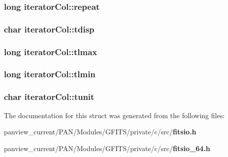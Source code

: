 \subsubsection{\setlength{\rightskip}{0pt plus 5cm}long \bf{iterator\-Col::repeat}}\label{structiteratorCol_4316f8b44d3df0ca6c847ee578ef2f2a}


\subsubsection{\setlength{\rightskip}{0pt plus 5cm}char \bf{iterator\-Col::tdisp}}\label{structiteratorCol_b7ded5b2f1a55f33faae8aad25f0e661}


\subsubsection{\setlength{\rightskip}{0pt plus 5cm}long \bf{iterator\-Col::tlmax}}\label{structiteratorCol_46b1c744ebe68dd1625146ab2dec68b4}


\subsubsection{\setlength{\rightskip}{0pt plus 5cm}long \bf{iterator\-Col::tlmin}}\label{structiteratorCol_cdacdd8ce6d68735ce3bb58edd8f8925}


\subsubsection{\setlength{\rightskip}{0pt plus 5cm}char \bf{iterator\-Col::tunit}}\label{structiteratorCol_27b2e75fa7e805013c9a24e0a5127b42}




The documentation for this struct was generated from the following files:\begin{CompactItemize}
\item 
panview\_\-current/PAN/Modules/GFITS/private/c/src/\bf{fitsio.h}\item 
panview\_\-current/PAN/Modules/GFITS/private/c/src/\bf{fitsio\_\-64.h}\end{CompactItemize}
